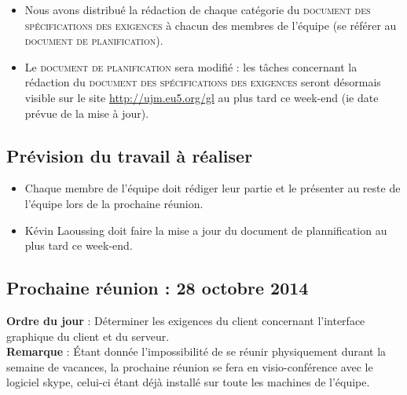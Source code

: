 \documentclass[12pt,a4paper]{article}
\begin{document}
\begin{itemize}[label = $\blacktriangleright$]
\item Nous avons distribué la rédaction de chaque catégorie du \textsc{document des spécifications des exigences} à chacun des membres de l'équipe (se référer au \textsc{document de planification}).

\item Le \textsc{document de planification} sera modifié : les tâches concernant la rédaction du \textsc{document des spécifications des exigences} seront désormais visible sur le site \url{http://ujm.eu5.org/gl} au plus tard ce week-end (ie date prévue de la mise à jour).\\
\end{itemize}

\subsection*{Prévision du travail à réaliser}

\begin{itemize}[label = $\blacktriangleright$]
\item Chaque membre de l'équipe doit rédiger leur partie et le présenter au reste de l'équipe lors de la prochaine réunion.

\item Kévin Laoussing doit faire la mise a jour du \textsf{document de plannification} au plus tard ce week-end.\\
\end{itemize}

\subsection*{Prochaine réunion : 28 octobre 2014}

\textbf{Ordre du jour} : Déterminer les exigences du client concernant l'interface graphique du client et du serveur.\\

\textbf{Remarque} : Étant donnée l'impossibilité de se réunir physiquement durant la semaine de vacances, la prochaine réunion se fera en visio-conférence avec le logiciel skype, celui-ci étant déjà installé sur toute les machines de l'équipe.
\end{document}
